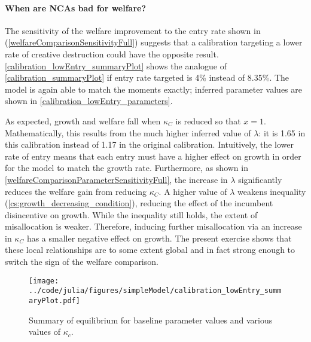 \documentclass[11pt,english]{article}
\theoremstyle{remark}
\begin{document}
\paragraph{When are NCAs bad for welfare?}

The sensitivity of the welfare improvement to the entry rate shown in (\ref{welfareComparisonSensitivityFull}) suggests that a calibration targeting a lower rate of creative destruction could have the opposite result. \autoref{calibration_lowEntry_summaryPlot} shows the analogue of \autoref{calibration_summaryPlot} if entry rate targeted is 4\% instead of 8.35\%. The model is again able to match the moments exactly; inferred parameter values are shown in \autoref{calibration_lowEntry_parameters}.

As expected, growth and welfare fall when $\kappa_C$ is reduced so that $x = 1$. Mathematically, this results from the much higher inferred value of $\lambda$: it is 1.65 in this calibration instead of 1.17 in the original calibration. Intuitively, the lower rate of entry means that each entry must have a higher effect on growth in order for the model to match the growth rate. Furthermore, as shown in \autoref{welfareComparisonParameterSensitivityFull}, the increase in $\lambda$ significantly reduces the welfare gain from reducing $\kappa_C$. A higher value of $\lambda$ weakens inequality (\ref{cs:growth_decreasing_condition}), reducing the effect of the incumbent disincentive on growth. While the inequality still holds, the extent of misallocation is weaker. Therefore, inducing further misallocation via an increase in $\kappa_C$ has a smaller negative effect on growth. The present exercise shows that these local relationships are to some extent global and in fact strong enough to switch the sign of the welfare comparison.

\begin{figure}[]
	\texttt{[image: ../code/julia/figures/simpleModel/calibration\_lowEntry\_summaryPlot.pdf]}
	\caption{Summary of equilibrium for baseline parameter values and various values of $\kappa_c$.}
	\label{calibration_lowEntry_summaryPlot}
\end{figure}
\end{document}
